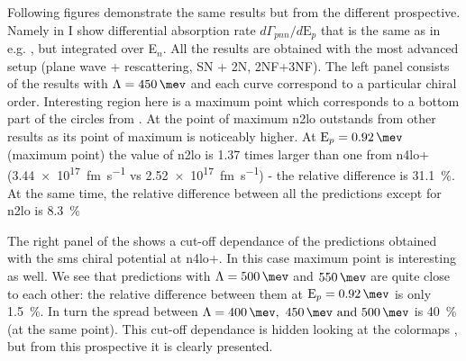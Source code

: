     Following figures demonstrate the same results but from the different prospective.
    Namely in  I show differential absorption rate $d\Gamma_{pnn} /d\text{E}_p$
    that is the same as in e.g. , but integrated over E$_n$.
    All the results are obtained with the most advanced setup (plane wave + rescattering, SN + 2N, 2NF+3NF).
    The left panel consists of the results with $\Lambda=\SI{450}{\mev}$ and each curve correspond 
    to a particular chiral order. Interesting region here is a maximum point which corresponds
    to a bottom part of the circles from . At the point of maximum
    \gls{n2lo} outstands from other results as its point of maximum is noticeably higher.
    At $\text{E}_p = \SI{0.92}{\mev}$ (maximum point) the value of \gls{n2lo} is
    \num{1.37} times larger than one from \gls{n4lo+} (\SI{3.44e+17}{fm.\s^{-1}}
    vs \SI{2.52e+17}{fm.\s^{-1}}) - the relative difference is \SI{31.1}{\percent}.
    At the same time, the relative difference between all the predictions except for \gls{n2lo}
    is \SI{8.3}{\percent}

    The right panel of the  shows a cut-off dependance of the predictions obtained
    with the \gls{sms} chiral potential at \gls{n4lo+}. In this case maximum point is interesting as well.
    We see that predictions with $\Lambda=\SI{500}{\mev}$ and $\SI{550}{\mev}$ are quite close to each other:
    the relative difference between them at $\text{E}_p = \SI{0.92}{\mev}$ is only \SI{1.5}{\percent}.
    In turn the spread between $\Lambda=\SIlist{400;450;500}{\mev}$ is \SI{40}{\percent} (at the same point).
    This cut-off dependance is hidden looking at the colormaps 
    , but from this prospective it is clearly presented.

